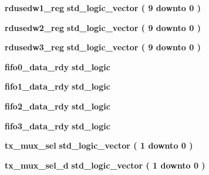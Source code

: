 \begin{DoxyCompactItemize}
\item 
{\bf rdusedw1\+\_\+reg} {\bfseries \textcolor{comment}{std\+\_\+logic\+\_\+vector}\textcolor{vhdlchar}{ }\textcolor{vhdlchar}{(}\textcolor{vhdlchar}{ }\textcolor{vhdlchar}{ } \textcolor{vhdldigit}{9} \textcolor{vhdlchar}{ }\textcolor{keywordflow}{downto}\textcolor{vhdlchar}{ }\textcolor{vhdlchar}{ } \textcolor{vhdldigit}{0} \textcolor{vhdlchar}{ }\textcolor{vhdlchar}{)}\textcolor{vhdlchar}{ }} 
\item 
{\bf rdusedw2\+\_\+reg} {\bfseries \textcolor{comment}{std\+\_\+logic\+\_\+vector}\textcolor{vhdlchar}{ }\textcolor{vhdlchar}{(}\textcolor{vhdlchar}{ }\textcolor{vhdlchar}{ } \textcolor{vhdldigit}{9} \textcolor{vhdlchar}{ }\textcolor{keywordflow}{downto}\textcolor{vhdlchar}{ }\textcolor{vhdlchar}{ } \textcolor{vhdldigit}{0} \textcolor{vhdlchar}{ }\textcolor{vhdlchar}{)}\textcolor{vhdlchar}{ }} 
\item 
{\bf rdusedw3\+\_\+reg} {\bfseries \textcolor{comment}{std\+\_\+logic\+\_\+vector}\textcolor{vhdlchar}{ }\textcolor{vhdlchar}{(}\textcolor{vhdlchar}{ }\textcolor{vhdlchar}{ } \textcolor{vhdldigit}{9} \textcolor{vhdlchar}{ }\textcolor{keywordflow}{downto}\textcolor{vhdlchar}{ }\textcolor{vhdlchar}{ } \textcolor{vhdldigit}{0} \textcolor{vhdlchar}{ }\textcolor{vhdlchar}{)}\textcolor{vhdlchar}{ }} 
\item 
{\bf fifo0\+\_\+data\+\_\+rdy} {\bfseries \textcolor{comment}{std\+\_\+logic}\textcolor{vhdlchar}{ }} 
\item 
{\bf fifo1\+\_\+data\+\_\+rdy} {\bfseries \textcolor{comment}{std\+\_\+logic}\textcolor{vhdlchar}{ }} 
\item 
{\bf fifo2\+\_\+data\+\_\+rdy} {\bfseries \textcolor{comment}{std\+\_\+logic}\textcolor{vhdlchar}{ }} 
\item 
{\bf fifo3\+\_\+data\+\_\+rdy} {\bfseries \textcolor{comment}{std\+\_\+logic}\textcolor{vhdlchar}{ }} 
\item 
{\bf tx\+\_\+mux\+\_\+sel} {\bfseries \textcolor{comment}{std\+\_\+logic\+\_\+vector}\textcolor{vhdlchar}{ }\textcolor{vhdlchar}{(}\textcolor{vhdlchar}{ }\textcolor{vhdlchar}{ } \textcolor{vhdldigit}{1} \textcolor{vhdlchar}{ }\textcolor{keywordflow}{downto}\textcolor{vhdlchar}{ }\textcolor{vhdlchar}{ } \textcolor{vhdldigit}{0} \textcolor{vhdlchar}{ }\textcolor{vhdlchar}{)}\textcolor{vhdlchar}{ }} 
\item 
{\bf tx\+\_\+mux\+\_\+sel\+\_\+d} {\bfseries \textcolor{comment}{std\+\_\+logic\+\_\+vector}\textcolor{vhdlchar}{ }\textcolor{vhdlchar}{(}\textcolor{vhdlchar}{ }\textcolor{vhdlchar}{ } \textcolor{vhdldigit}{1} \textcolor{vhdlchar}{ }\textcolor{keywordflow}{downto}\textcolor{vhdlchar}{ }\textcolor{vhdlchar}{ } \textcolor{vhdldigit}{0} \textcolor{vhdlchar}{ }\textcolor{vhdlchar}{)}\textcolor{vhdlchar}{ }} 

\end{DoxyCompactItemize}
